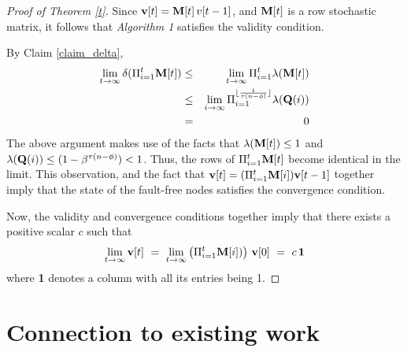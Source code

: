 \documentclass[letterpaper, 11pt]{article}
\begin{document}
\begin{proof}[Proof of Theorem \ref{t}]

Since ${\bf v}[t]={\bf M}[t]\,v[t-1]$, and ${\bf M}[t]$ is a row stochastic matrix, it
follows that
\emph {Algorithm 1} satisfies the validity condition.

By Claim \ref{claim_delta},
\begin{eqnarray}
\lim_{t\rightarrow \infty} \delta(\Pi_{i=1}^t {\bf M}[t])
& \leq & \lim_{t\rightarrow\infty} \Pi_{i=1}^t \lambda({\bf M}[t]) \\
& \leq & \lim_{i\rightarrow\infty} \Pi_{i=1}^{\lfloor\frac{t}{\tau(n-\phi)}\rfloor} \lambda({\bf Q}(i)) \\
& = & 0
\end{eqnarray}
The above argument makes use of the facts that
$\lambda({\bf M}[t])\leq 1$ and $\lambda({\bf Q}(i))\leq (1-\beta^{\tau(n-\phi)})<1$.
Thus, the rows of $\Pi_{i=1}^t {\bf M}[t]$ become identical in the limit.
This observation, and the fact that ${\bf v}[t]=(\Pi_{i=1}^t {\bf M}[i]){\bf v}[t-1]$ together imply that
the state of the fault-free nodes satisfies the
convergence condition.


Now, the validity and convergence conditions
together imply that
there exists a positive scalar $c$ such that
\[
\lim_{t\rightarrow\infty}
{\bf v}[t] ~ = ~ \lim_{t\rightarrow\infty} \left( \Pi_{i=1}^t {\bf M}[i]) \right)\,
{\bf v}[0] ~ = ~ c\,{\bf 1}
\]
where {\bf 1} denotes a column with all its entries being 1.
\end{proof}

\section{Connection to existing work}\label{app:connection}
\end{document}
